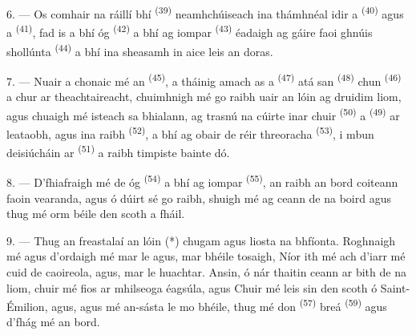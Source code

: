 \VUsaut{4.0mm}
\VUsaut{3.0mm}

6. --- Os comhair na ráillí bhí  \textsuperscript{(39)}
neamhchúiseach ina thámhnéal idir a  \textsuperscript{(40)}
agus a  \textsuperscript{(41)}, fad is a bhí  óg \textsuperscript{(42)} a bhí ag iompar 
\textsuperscript{(43)} éadaigh ag gáire faoi ghnúis shollúnta  \textsuperscript{(44)} a bhí ina sheasamh in aice leis an doras.

7. --- Nuair a chonaic mé an  \textsuperscript{(45)}, a tháinig
amach as a  \textsuperscript{(47)} atá san 
\textsuperscript{(48)} chun  \textsuperscript{(46)} a chur
ar theachtaireacht, chuimhnigh mé go raibh uair an lóin ag druidim liom, agus chuaigh
mé isteach sa bhialann, ag trasnú na cúirte inar chuir  \textsuperscript{(50)} a  \textsuperscript{(49)} ar
leataobh, agus ina raibh  \textsuperscript{(52)}, a bhí ag obair de
réir threoracha  \textsuperscript{(53)}, i mbun deisiúcháin ar
 \textsuperscript{(51)} a raibh timpiste bainte dó.

8. --- D'fhiafraigh mé de  óg \textsuperscript{(54)} a bhí ag iompar
 \textsuperscript{(55)}, an raibh an bord coiteann faoin
vearanda, agus ó dúirt sé go raibh, shuigh mé ag ceann de na boird agus thug mé orm
béile den scoth a fháil.


\VUsaut{4.0mm}
\VUsaut{3.0mm}

9. --- Thug an freastalaí  an lóin (*) chugam agus liosta na
bhfíonta. Roghnaigh mé agus d'ordaigh mé mar  le
 agus, mar bhéile tosaigh,  Níor ith mé
 ach d'iarr mé cuid de  caoireola, agus, mar
 le huachtar. Ansin, ó nár thaitin ceann ar bith
de na  liom, chuir mé fios ar mhilseoga éagsúla,
 agus  Chuir mé leis sin  den scoth ó
Saint-Émilion, agus, agus mé an-sásta le mo bhéile, thug mé don
 \textsuperscript{(57)}  breá
\textsuperscript{(59)} agus d'fhág mé an bord.

